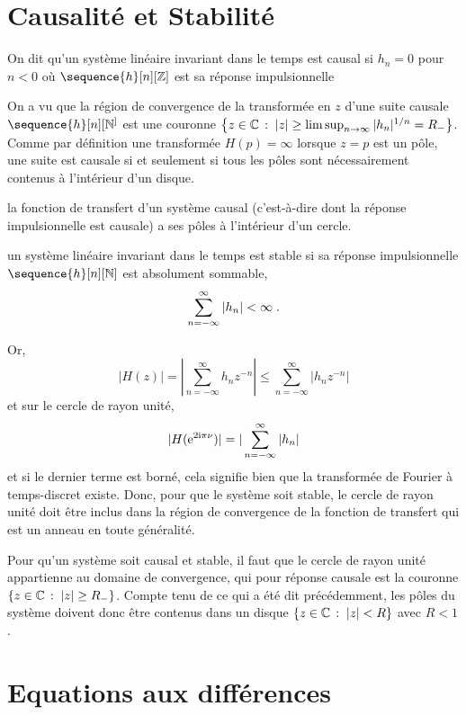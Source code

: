 \section{Causalité et Stabilité}
\begin{definition}
On dit qu'un système linéaire invariant dans le temps est causal si $h_n=0$ pour $n < 0$ où $\sequence{h}[n][\zset]$ est sa réponse impulsionnelle
\end{definition}
On a vu que la région de convergence de la transform\'{e}e en $z$ d'une suite causale $\sequence{h}[n][\nset^]$
est une couronne  $\left\{z \in \mathbb{C}\,:\; |z| \geq \limsup_{n \to \infty} |h_n|^{1/n}= R_-\right\}$. Comme par définition
une transform\'{e}e $H(p)= \infty$ lorsque $z= p$ est un pôle, une suite est causale si et seulement si
tous les p\^{o}les sont n\'{e}cessairement contenus \`{a} l'int\'{e}rieur d'un disque.

\begin{proposition}
la fonction de transfert d'un syst\`{e}me causal (c'est-\`{a}-dire dont la r\'{e}ponse impulsionnelle est causale) a ses p\^{o}les \`{a} l'int\'{e}rieur d'un cercle.
\end{proposition}

\begin{definition}
un syst\`{e}me linéaire invariant dans le temps est stable si sa r\'{e}ponse impulsionnelle $\sequence{h}[n][\nset]$ est absolument sommable,
$$
\sum_{n=-\infty}^{\infty}|h_n|<\infty \;.
$$
\end{definition}
Or,
$$
|H(z)|=|\sum_{n=-\infty}^{\infty}h_n z^{-n}|\leq\sum_{n=-\infty}^{\infty}|h_nz^{-n}|
$$
et sur le cercle de rayon unit\'{e},
$$
|H(\mathrm{e}^{2 \mathrm{i} \pi \nu})|=|\sum_{n=-\infty}^{\infty} |h_n|
$$
et si le dernier terme est born\'{e}, cela signifie bien que la transform\'{e}e de Fourier à temps-discret existe.  Donc, pour que le syst\`{e}me soit stable, le cercle de rayon unit\'{e} doit être inclus dans la région de convergence de la fonction de transfert qui est un anneau en toute g\'{e}n\'{e}ralit\'{e}.

Pour qu'un syst\`{e}me soit causal et stable, il faut que le cercle de rayon unit\'{e} appartienne au domaine de convergence, qui pour réponse causale est la couronne $\left\{z \in \mathbb{C}\,:\; |z| \geq R_-\right\}$. Compte tenu de ce qui a \'{e}t\'{e} dit pr\'{e}c\'{e}demment, les p\^{o}les du syst\`{e}me doivent donc \^{e}tre contenus dans un disque $\left\{z \in \mathbb{C}\,:\; |z| < R\right\}$ avec $R < 1$.

\section{Equations aux diff\'{e}rences}

